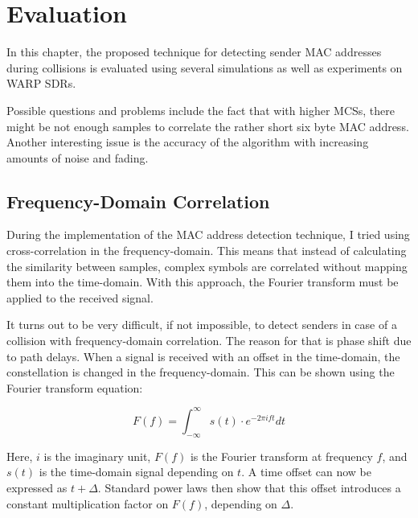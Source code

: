 
\chapter{Evaluation}\label{ch:evaluation}
\glsresetall %
 

In this chapter, the proposed technique for detecting sender \gls{MAC} addresses during collisions is evaluated using several simulations as well as experiments on \gls{WARP} \glspl{SDR}.

Possible questions and problems include the fact that with higher \glspl{MCS}, there might be not enough samples to correlate the rather short six byte \gls{MAC} address. Another interesting issue is the accuracy of the algorithm with increasing amounts of noise and fading.



\section{Frequency-Domain Correlation}\label{sec:freqd-correlation}

During the implementation of the \gls{MAC} address detection technique, I tried using cross-correlation in the frequency-domain. This means that instead of calculating the similarity between samples, complex symbols are correlated without mapping them into the time-domain. With this approach, the Fourier transform must be applied to the received signal.

It turns out to be very difficult, if not impossible, to detect senders in case of a collision with frequency-domain correlation. The reason for that is phase shift due to path delays. When a signal is received with an offset in the time-domain, the constellation is changed in the frequency-domain. This can be shown using the Fourier transform equation:

$$ F(f) = \int_{-\infty}^{\infty} s(t) \cdot e^{-2 \pi i f t} dt $$\vspace{0cm}

Here, $ i $ is the imaginary unit, $ F(f) $ is the Fourier transform at frequency $ f $, and $ s(t) $ is the time-domain signal depending on $ t $. A time offset can now be expressed as $ t + \Delta $. Standard power laws then show that this offset introduces a constant multiplication factor on $ F(f) $, depending on $ \Delta $.

